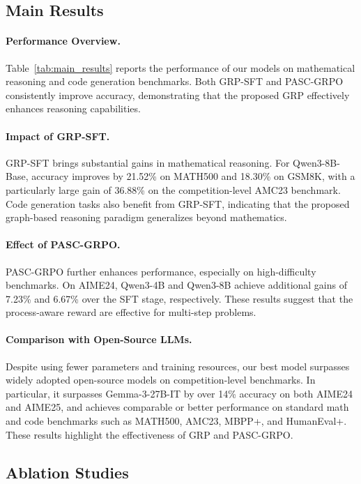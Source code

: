\subsection{Main Results}

\paragraph{Performance Overview.} 
Table~\ref{tab:main_results} reports the performance of our models on mathematical reasoning and code generation benchmarks. 
Both GRP-SFT and PASC-GRPO consistently improve accuracy, demonstrating that the proposed GRP effectively enhances reasoning capabilities.

\paragraph{Impact of GRP-SFT.}
GRP-SFT brings substantial gains in mathematical reasoning. For Qwen3-8B-Base, accuracy improves by 21.52\% on MATH500 and 18.30\% on GSM8K, with a particularly large gain of 36.88\% on the competition-level AMC23 benchmark. Code generation tasks also benefit from GRP-SFT, indicating that the proposed graph-based reasoning paradigm generalizes beyond mathematics.

\paragraph{Effect of PASC-GRPO.}
PASC-GRPO further enhances performance, especially on high-difficulty benchmarks. On AIME24, Qwen3-4B and Qwen3-8B achieve additional gains of 7.23\% and 6.67\% over the SFT stage, respectively. These results suggest that the process-aware reward are effective for multi-step problems.

\paragraph{Comparison with Open-Source LLMs.}
Despite using fewer parameters and training resources, our best model surpasses widely adopted open-source models on competition-level benchmarks.  In particular, it surpasses Gemma-3-27B-IT by over 14\% accuracy on both AIME24 and AIME25, and achieves comparable or better performance on standard math and code benchmarks such as MATH500, AMC23, MBPP+, and HumanEval+. These results highlight the effectiveness of GRP and PASC-GRPO.

\subsection{Ablation Studies}

